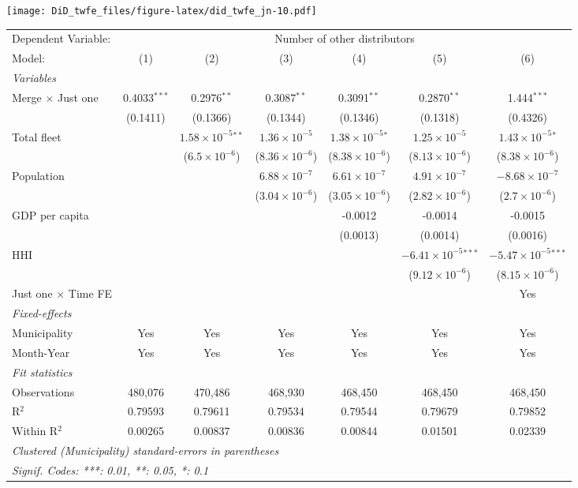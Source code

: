 \documentclass[
]{article}
\begin{document}
\texttt{[image: DiD\_twfe\_files/figure-latex/did\_twfe\_jn-10.pdf]}

\begin{tabular}{lcccccc}
\tabularnewline\midrule\midrule
Dependent Variable:&\multicolumn{6}{c}{Number of other distributors}\\
Model:&(1) & (2) & (3) & (4) & (5) & (6)\\
\midrule \emph{Variables}&   &   &   &   &   &  \\
Merge $\times $ Just one & 0.4033$^{***}$ & 0.2976$^{**}$ & 0.3087$^{**}$ & 0.3091$^{**}$ & 0.2870$^{**}$ & 1.444$^{***}$\\
  &(0.1411) & (0.1366) & (0.1344) & (0.1346) & (0.1318) & (0.4326)\\
Total fleet &    & $1.58\times 10^{-5}$$^{**}$ & $1.36\times 10^{-5}$ & $1.38\times 10^{-5}$$^{*}$ & $1.25\times 10^{-5}$ & $1.43\times 10^{-5}$$^{*}$\\
  &   & ($6.5\times 10^{-6}$) & ($8.36\times 10^{-6}$) & ($8.38\times 10^{-6}$) & ($8.13\times 10^{-6}$) & ($8.38\times 10^{-6}$)\\
Population &    &    & $6.88\times 10^{-7}$ & $6.61\times 10^{-7}$ & $4.91\times 10^{-7}$ & $-8.68\times 10^{-7}$\\
  &   &    & ($3.04\times 10^{-6}$) & ($3.05\times 10^{-6}$) & ($2.82\times 10^{-6}$) & ($2.7\times 10^{-6}$)\\
GDP per capita &    &    &    & -0.0012 & -0.0014 & -0.0015\\
  &   &    &    & (0.0013) & (0.0014) & (0.0016)\\
HHI &    &    &    &    & $-6.41\times 10^{-5}$$^{***}$ & $-5.47\times 10^{-5}$$^{***}$\\
  &   &    &    &    & ($9.12\times 10^{-6}$) & ($8.15\times 10^{-6}$)\\
Just one $\times$ Time FE &  &  &  &  &  & Yes\\
\midrule \emph{Fixed-effects}&   &   &   &   &   &  \\
Municipality & Yes & Yes & Yes & Yes & Yes & Yes\\
Month-Year & Yes & Yes & Yes & Yes & Yes & Yes\\
\midrule \emph{Fit statistics}&  & & & & & \\
Observations & 480,076&470,486&468,930&468,450&468,450&468,450\\
R$^2$ & 0.79593&0.79611&0.79534&0.79544&0.79679&0.79852\\
Within R$^2$ & 0.00265&0.00837&0.00836&0.00844&0.01501&0.02339\\
\midrule\midrule\multicolumn{7}{l}{\emph{Clustered (Municipality) standard-errors in parentheses}}\\
\multicolumn{7}{l}{\emph{Signif. Codes: ***: 0.01, **: 0.05, *: 0.1}}\\
\end{tabular}
\end{document}
